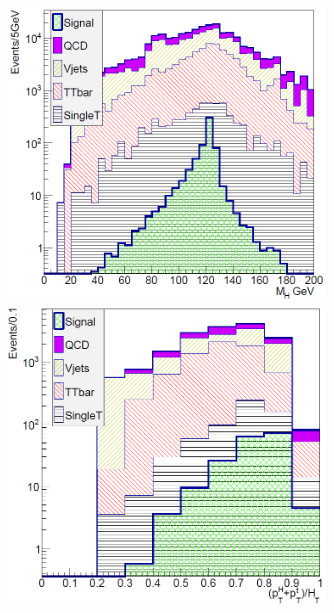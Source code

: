 \begin{frame}{}
\begin{columns}
\begin{column}{.50\textwidth}
\begin{figure}[!Hhtbp]
  \begin{center}
    \includegraphics[width=0.75\textwidth]{../figs/Pheno/MH.png}\\
    \includegraphics[width=0.75\textwidth]{../figs/Pheno/RelHT.png}
  \end{center}
\end{figure}
\end{column}
\end{columns}

\end{frame}

